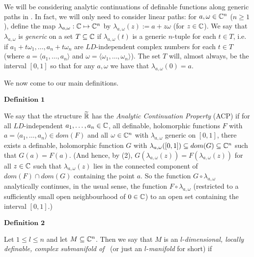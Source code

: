 \documentclass[12pt,nodate]{article}
\begin{document}
\vspace{3mm}

We will be considering analytic continuations of definable functions along generic paths in \Cn . In fact, we will only need to consider linear paths: for $a, \omega \in \mathbb{C}^{n}$ ($n \geq 1$), define the map $\lambda_{a, \omega} : \mathbb{C} \mapsto \mathbb{C}^{n}$ by $\lambda_{a, \omega} (z) := a + z\omega $ (for $z \in \mathbb{C}$). We say that  $\lambda_{a, \omega}$ is \emph{generic} on a set $T \subseteq \mathbb{C}$ if $\lambda_{a, \omega} (t)$ is a generic $n$-tuple for each $t \in T$, i.e. if $a_1 + t\omega_1  , \ldots , a_n + t\omega_n $ are $LD$-independent complex numbers for each $t \in T$ (where $a = \langle a_1 , \ldots , a_n \rangle$ and 
$\omega = \langle \omega_1 , \ldots , \omega_n \rangle$). The set $T$ will, almost always, be the interval $[0, 1]$ so that for any $a, \omega$ we have that $\lambda_{a, \omega}(0) = a$.

\vspace{1mm}

We now come to our main definitions.

\newpage

\noindent
$\mathbf{Definition}$ $\mathbf{1}$

\vspace{1mm}

We say that the structure $\widetilde{\mathbb{R}}$ has the \emph{Analytic Continuation Property} (ACP) if for all $LD$-independent $a_1 , \ldots , a_n \in \mathbb{C}$, all definable, holomorphic functions $F$ with $a= \langle a_1 , \ldots , a_n \rangle \in dom(F)$ and all $\omega \in \mathbb{C}^{n}$ with $\lambda_{a, \omega}$ generic on $[0, 1]$, there exists a definable, holomorphic function $G$ with  $\lambda_{a, \omega}([0, 1]) \subseteq dom(G) \subseteq \mathbb{C}^{n}$ such that $G(a)  = F(a)$. (And hence, by (2), $G(\lambda_{a, \omega} (z)) = F(\lambda_{a, \omega} (z))$ for all $z \in \mathbb{C}$ such that $\lambda_{a, \omega} (z)$ lies in the connected component of $dom(F) \cap dom(G)$ containing the point $a$. So the function $G\circ \lambda_{a, \omega}$  analytically continues, in the usual sense,  the function $F\circ \lambda_{a, \omega}$ (restricted to a sufficiently small open neighbourhood of $0 \in \mathbb{C}$) to an open set containing the interval $[0, 1]$.)

\vspace{3mm}

\noindent 
$\mathbf{Definition}$ $\mathbf{2}$

\vspace{1mm}

Let $1 \leq l \leq n$ and let $M \subseteq \mathbb{C}^{n}$. Then we say that $M$ is an $l$-\emph{dimensional, locally definable, complex submanifold of} \Cn\ (or just an $l$-\emph{manifold} for short) if
\end{document}
